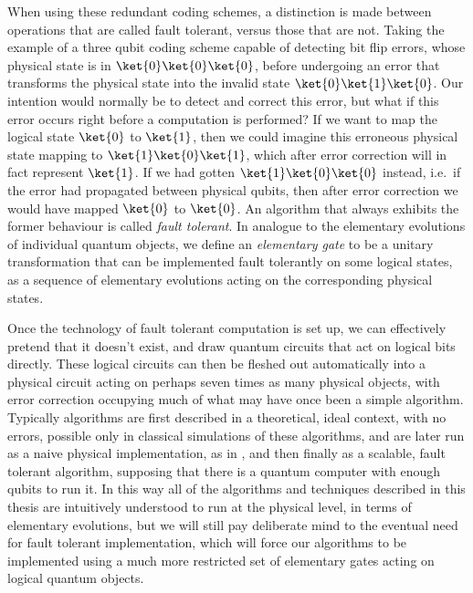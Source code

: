 When using these redundant coding schemes, a distinction is made between operations that are called fault tolerant, versus those that are not. Taking the example of a three qubit coding scheme capable of detecting bit flip errors, whose physical state is in $\ket{0}\ket{0}\ket{0}$, before undergoing an error that transforms the physical state into the invalid state $\ket{0}\ket{1}\ket{0}$. Our intention would normally be to detect and correct this error, but what if this error occurs right before a computation is performed? If we want to map the logical state $\ket{0}$ to $\ket{1}$, then we could imagine this erroneous physical state mapping to $\ket{1}\ket{0}\ket{1}$, which after error correction will in fact represent $\ket{1}$. If we had gotten $\ket{1}\ket{0}\ket{0}$ instead, i.e.\ if the error had propagated between physical qubits, then after error correction we would have mapped $\ket{0}$ to $\ket{0}$. An algorithm that always exhibits the former behaviour is called \emph{fault tolerant}. In analogue to the elementary evolutions of individual quantum objects, we define an \emph{elementary gate} to be a unitary transformation that can be implemented fault tolerantly on some logical states, as a sequence of elementary evolutions acting on the corresponding physical states.

Once the technology of fault tolerant computation is set up, we can effectively pretend that it doesn't exist, and draw quantum circuits that act on logical bits directly. These logical circuits can then be fleshed out automatically into a physical circuit acting on perhaps seven times as many physical objects, with error correction occupying much of what may have once been a simple algorithm. Typically algorithms are first described in a theoretical, ideal context, with no errors, possible only in classical simulations of these algorithms, and are later run as a naive physical implementation, as in \cite{algos}, and then finally as a scalable, fault tolerant algorithm, supposing that there is a quantum computer with enough qubits to run it. In this way all of the algorithms and techniques described in this thesis are intuitively understood to run at the physical level, in terms of elementary evolutions, but we will still pay deliberate mind to the eventual need for fault tolerant implementation, which will force our algorithms to be implemented using a much more restricted set of elementary gates acting on logical quantum objects.

